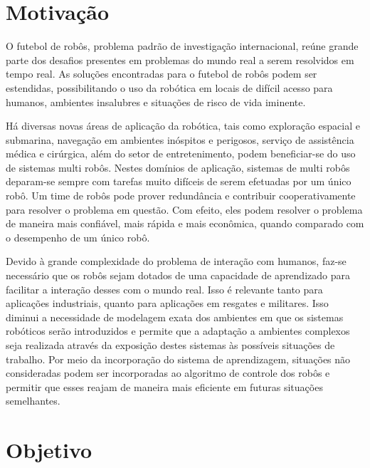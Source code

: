 \section{Motivação}

O futebol de robôs, problema padrão de investigação internacional, reúne grande parte
dos desafios presentes em problemas do mundo real a serem resolvidos em tempo real.
As soluções encontradas para o futebol de robôs podem ser estendidas, possibilitando
o uso da robótica em locais de difícil acesso para humanos, ambientes insalubres e
situações de risco de vida iminente.

Há diversas novas áreas de aplicação da robótica, tais como exploração espacial e submarina,
navegação em ambientes inóspitos e perigosos, serviço de assistência médica
e cirúrgica, além do setor de entretenimento, podem beneficiar-se do uso de sistemas
multi robôs. Nestes domínios de aplicação, sistemas de multi robôs deparam-se sempre
com tarefas muito difíceis de serem efetuadas por um único robô. Um time de robôs pode
prover redundância e contribuir cooperativamente para resolver o problema em questão.
Com efeito, eles podem resolver o problema de maneira mais confiável, mais rápida e
mais econômica, quando comparado com o desempenho de um único robô.


Devido à grande complexidade do problema de interação com humanos, faz-se necessário
que os robôs sejam dotados de uma capacidade de aprendizado para facilitar a interação
desses com o mundo real. Isso é relevante tanto para aplicações industriais, quanto para
aplicações em resgates e militares. Isso diminui a necessidade de modelagem
exata dos ambientes em que os sistemas robóticos serão introduzidos e permite que
a adaptação a ambientes complexos seja realizada através da exposição destes sistemas
às possíveis situações de trabalho. Por meio da incorporação do sistema de
aprendizagem, situações não consideradas podem ser incorporadas ao algoritmo de
controle dos robôs e permitir que esses reajam de maneira mais eficiente em futuras
situações semelhantes.

\section{Objetivo}

